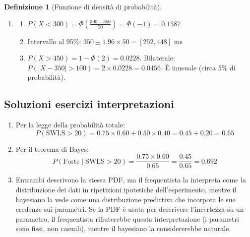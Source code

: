 \documentclass[
  italian,
  letterpaper,
  a4paper,
  11pt,
  open=any]{scrbook}
\newenvironment{Shaded}{\begin{snugshade}}{\end{snugshade}}
\newcommand{\AttributeTok}[1]{\textcolor[rgb]{0.40,0.45,0.13}{#1}}
\newcommand{\CommentTok}[1]{\textcolor[rgb]{0.37,0.37,0.37}{#1}}
\newcommand{\DecValTok}[1]{\textcolor[rgb]{0.68,0.00,0.00}{#1}}
\newcommand{\FloatTok}[1]{\textcolor[rgb]{0.68,0.00,0.00}{#1}}
\newcommand{\FunctionTok}[1]{\textcolor[rgb]{0.28,0.35,0.67}{#1}}
\newcommand{\NormalTok}[1]{\textcolor[rgb]{0.00,0.23,0.31}{#1}}
\newcommand{\SpecialCharTok}[1]{\textcolor[rgb]{0.37,0.37,0.37}{#1}}
\theoremstyle{plain}
\theoremstyle{definition}
\theoremstyle{definition}
\newtheorem{definition}{Definizione}[chapter]
\theoremstyle{remark}
\begin{document}
\begin{definition}[Funzione di densità di
probabilità]
\begin{tcolorbox}
\begin{enumerate}
\begin{Shaded}
\begin{Highlighting}[]
\DecValTok{1} \SpecialCharTok{{-}} \FunctionTok{pnorm}\NormalTok{(}\DecValTok{25}\NormalTok{, }\AttributeTok{mean =} \DecValTok{20}\NormalTok{, }\AttributeTok{sd =} \DecValTok{5}\NormalTok{)  }\CommentTok{\# 0.1587}
\FunctionTok{pnorm}\NormalTok{(}\DecValTok{25}\NormalTok{, }\DecValTok{20}\NormalTok{, }\DecValTok{5}\NormalTok{) }\SpecialCharTok{{-}} \FunctionTok{pnorm}\NormalTok{(}\DecValTok{15}\NormalTok{, }\DecValTok{20}\NormalTok{, }\DecValTok{5}\NormalTok{)  }\CommentTok{\# 0.6827}
\FunctionTok{qnorm}\NormalTok{(}\FloatTok{0.90}\NormalTok{, }\AttributeTok{mean =} \DecValTok{20}\NormalTok{, }\AttributeTok{sd =} \DecValTok{5}\NormalTok{)  }\CommentTok{\# 26.41}
\end{Highlighting}
\end{Shaded}
\item
  \begin{enumerate}
  \def\labelenumii{\alph{enumii}.}
  \item
    \(P(X < 300) = \Phi\left(\frac{300-350}{50}\right) = \Phi(-1) = 0.1587\)
  \item
    Intervallo al 95\%: \(350 \pm 1.96 \times 50 = [252, 448]\) ms
  \item
    \(P(X > 450) = 1 - \Phi(2) = 0.0228\). Bilaterale:
    \(P(|X - 350| > 100) = 2 \times 0.0228 = 0.0456\). È inusuale (circa
    5\% di probabilità).
  \end{enumerate}
\end{enumerate}

\subsection*{Soluzioni esercizi
interpretazioni}\label{soluzioni-esercizi-interpretazioni}

\begin{enumerate}
\def\labelenumi{\arabic{enumi}.}
\setcounter{enumi}{7}
\item
  Per la legge della probabilità totale:
  \[P(\text{SWLS} > 20) = 0.75 \times 0.60 + 0.50 \times 0.40 = 0.45 + 0.20 = 0.65\]
\item
  Per il teorema di Bayes:
  \[P(\text{Forte} \mid \text{SWLS} > 20) = \frac{0.75 \times 0.60}{0.65} = \frac{0.45}{0.65} = 0.692\]
\item
  Entrambi descrivono la stessa PDF, ma il frequentista la interpreta
  come la distribuzione dei dati in ripetizioni ipotetiche
  dell'esperimento, mentre il bayesiano la vede come una distribuzione
  predittiva che incorpora le sue credenze sui parametri. Se la PDF è
  usata per descrivere l'incertezza su un parametro, il frequentista
  rifiuterebbe questa interpretazione (i parametri sono fissi, non
  casuali), mentre il bayesiano la considererebbe naturale.
\end{enumerate}


\end{tcolorbox}
\end{definition}
\end{document}
